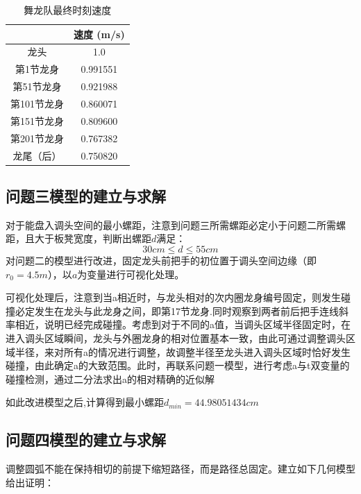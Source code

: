 \documentclass[withoutpreface,bwprint]{cumcmthesis} %
\begin{document}
\begin{table}[H]
	\centering
	\caption{舞龙队最终时刻速度}
	\begin{tabular}{|c|c|}
		\hline
  &速度 (m/s) \\ \hline
龙头 &1.0 \\ \hline
第1节龙身 &0.991551 \\ \hline
第51节龙身&0.921988 \\ \hline
第101节龙身 &0.860071 \\ \hline
第151节龙身 &0.809600 \\ \hline
第201节龙身 &0.767382 \\ \hline
龙尾（后） &0.750820 \\ \hline
	\end{tabular}
\end{table}

\subsection{问题三模型的建立与求解}

对于能盘入调头空间的最小螺距，注意到问题三所需螺距必定小于问题二所需螺距，且大于板凳宽度，判断出螺距$d$满足：
$$
30cm\le d\le 55cm
$$
对问题二的模型进行改进，固定龙头前把手的初位置于调头空间边缘（即$r_{0}=4.5m$），以$a$为变量进行可视化处理。

可视化处理后，注意到当a相近时，与龙头相对的次内圈龙身编号固定，则发生碰撞必定发生在龙头与此龙身之间，即第17节龙身.同时观察到两者前后把手连线斜率相近，说明已经完成碰撞。考虑到对于不同的a值，当调头区域半径固定时，在进入调头区域瞬间，龙头与外圈龙身的相对位置基本一致，由此可通过调整调头区域半径，来对所有a的情况进行调整，故调整半径至龙头进入调头区域时恰好发生碰撞，由此确定a的大致范围。此时，再联系问题一模型，进行考虑a与t双变量的碰撞检测，通过二分法求出a的相对精确的近似解

如此改进模型之后,计算得到最小螺距$d_{min}=44.98051434cm$



\subsection{问题四模型的建立与求解}

调整圆弧不能在保持相切的前提下缩短路径，而是路径总固定。建立如下几何模型给出证明：
\end{document}
